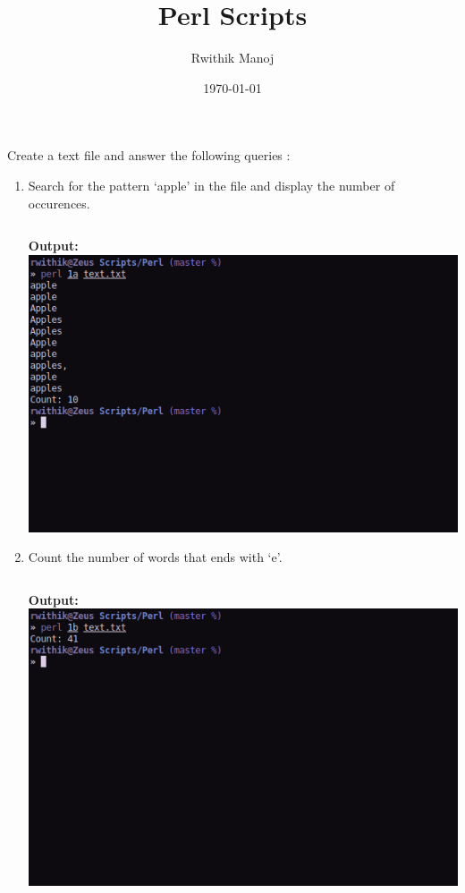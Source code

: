 \documentclass[10pt,a4paper,titlepage]{report}
\begin{document}
\begin{titlepage}
\author{Rwithik Manoj}
\title{Perl Scripts}
\date{\today}
\maketitle
\end{titlepage}

Create a text file and answer the following queries :
\begin{enumerate}
	\item Search for the pattern `apple’ in the file and display the number of occurences.\newline
	\newline
	\inputminted[tabsize=4]{perl}{../Scripts/Perl/1a}
	\textbf{Output: }\newline\newline
	\includegraphics[width=\linewidth]{../Images/Perl/1a.png}
	\pagebreak
	\item Count the number of words that ends with `e’.\newline
	\newline
	\inputminted[tabsize=4]{perl}{../Scripts/Perl/1b}
	\textbf{Output: }\newline\newline
	\includegraphics[width=\linewidth]{../Images/Perl/1b.png}

\end{enumerate}
\end{document}

